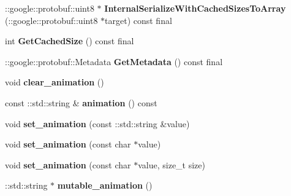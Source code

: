 \begin{DoxyCompactItemize}
\+::google\+::protobuf\+::uint8 $\ast$ {\bfseries Internal\+Serialize\+With\+Cached\+Sizes\+To\+Array} (\+::google\+::protobuf\+::uint8 $\ast$target) const final
\item 
\mbox{\label{classtbBasics_1_1SetActorAnimationBody_a10f725284e34833837c9ade2f00cc690}} 
int {\bfseries Get\+Cached\+Size} () const final
\item 
\mbox{\label{classtbBasics_1_1SetActorAnimationBody_a9645686528fd185f6fa1724076631628}} 
\+::google\+::protobuf\+::\+Metadata {\bfseries Get\+Metadata} () const final
\item 
\mbox{\label{classtbBasics_1_1SetActorAnimationBody_a1c8177b1d33c9e56f805bdf513cbc09e}} 
void {\bfseries clear\+\_\+animation} ()
\item 
\mbox{\label{classtbBasics_1_1SetActorAnimationBody_ac2869b41d528449d60ff4a9a3bc33dd4}} 
const \+::std\+::string \& {\bfseries animation} () const
\item 
\mbox{\label{classtbBasics_1_1SetActorAnimationBody_a69ee000eab5d7c00cb46de8aca66c67a}} 
void {\bfseries set\+\_\+animation} (const \+::std\+::string \&value)
\item 
\mbox{\label{classtbBasics_1_1SetActorAnimationBody_a34692210a8e2eb286c26611c3f7c8607}} 
void {\bfseries set\+\_\+animation} (const char $\ast$value)
\item 
\mbox{\label{classtbBasics_1_1SetActorAnimationBody_afa3e1b314e1b66f32abb09b48251fd04}} 
void {\bfseries set\+\_\+animation} (const char $\ast$value, size\+\_\+t size)
\item 
\mbox{\label{classtbBasics_1_1SetActorAnimationBody_a2f4e85ff1d25521f20c6160f8da59461}} 
\+::std\+::string $\ast$ {\bfseries mutable\+\_\+animation} ()
\item 
\mbox{\label{classtbBasics_1_1SetActorAnimationBody_aa22cc4029c5eb83258d0f92c233eff94}} 

\end{DoxyCompactItemize}
